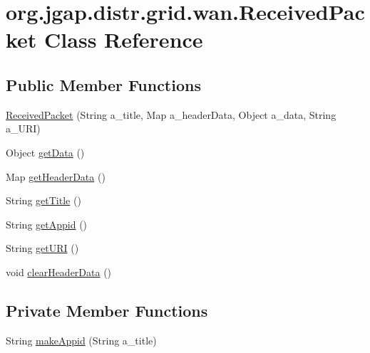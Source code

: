 \hypertarget{classorg_1_1jgap_1_1distr_1_1grid_1_1wan_1_1_received_packet}{\section{org.\-jgap.\-distr.\-grid.\-wan.\-Received\-Packet Class Reference}
\label{classorg_1_1jgap_1_1distr_1_1grid_1_1wan_1_1_received_packet}
}
\subsection*{Public Member Functions}
\begin{DoxyCompactItemize}
\item 
\hyperlink{classorg_1_1jgap_1_1distr_1_1grid_1_1wan_1_1_received_packet_a8ef0b44abc0228e774ff8e5d36ad3c8f}{Received\-Packet} (String a\-\_\-title, Map a\-\_\-header\-Data, Object a\-\_\-data, String a\-\_\-\-U\-R\-I)
\item 
Object \hyperlink{classorg_1_1jgap_1_1distr_1_1grid_1_1wan_1_1_received_packet_ae5a4a35f7b67d88ca26ace64b6c56fdf}{get\-Data} ()
\item 
Map \hyperlink{classorg_1_1jgap_1_1distr_1_1grid_1_1wan_1_1_received_packet_a51a5287f65fbe6aef5b2b682002bceaf}{get\-Header\-Data} ()
\item 
String \hyperlink{classorg_1_1jgap_1_1distr_1_1grid_1_1wan_1_1_received_packet_a538df409fec004438cf9798fae25237e}{get\-Title} ()
\item 
String \hyperlink{classorg_1_1jgap_1_1distr_1_1grid_1_1wan_1_1_received_packet_ad2d01e9735042cefa39011b13da328ca}{get\-Appid} ()
\item 
String \hyperlink{classorg_1_1jgap_1_1distr_1_1grid_1_1wan_1_1_received_packet_a93f6cae18da188e137fa8a704aaea517}{get\-U\-R\-I} ()
\item 
void \hyperlink{classorg_1_1jgap_1_1distr_1_1grid_1_1wan_1_1_received_packet_ae717c4ad849794e09f616b25882e2861}{clear\-Header\-Data} ()
\end{DoxyCompactItemize}
\subsection*{Private Member Functions}
\begin{DoxyCompactItemize}
\item 
String \hyperlink{classorg_1_1jgap_1_1distr_1_1grid_1_1wan_1_1_received_packet_a1e005aaa94d29ee9b6bdaff28e483154}{make\-Appid} (String a\-\_\-title)
\end{DoxyCompactItemize}
